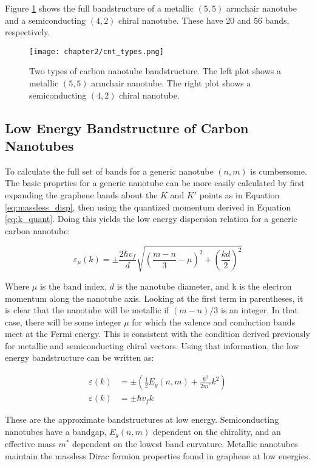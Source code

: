 Figure \ref{fig:cnt_types} shows the full bandstructure of a metallic $(5,5)$ armchair nanotube and a semiconducting $(4,2)$ chiral nanotube. These have 20 and 56 bands, respectively.

\begin{figure}
    \centering
    \texttt{[image: chapter2/cnt\_types.png]}
    \caption{Two types of carbon nanotube bandstructure. The left plot shows a metallic $(5,5)$ armchair nanotube. The right plot shows a semiconducting $(4,2)$ chiral nanotube.}
    \label{fig:cnt_types}
\end{figure}


\subsection{Low Energy Bandstructure of Carbon Nanotubes}

To calculate the full set of bands for a generic nanotube $(n,m)$ is cumbersome. The basic proprties for a generic nanotube can be more easily calculated by first expanding the graphene bands about the $K$ and $K'$ points as in Equation \ref{eq:massless_disp}, then using the quantized momentum derived in Equation \ref{eq:k_quant}. Doing this yields the low energy dispersion relation for a generic carbon nanotube:

\begin{equation}
    \varepsilon_{\mu}(k) = \pm\frac{2\hbar v_f}{d}\sqrt{\left(\frac{m-n}{3} - \mu\right)^2 + \left(\frac{kd}{2}\right)^2}
    \label{eq:low_e_cnt}
\end{equation}

Where $\mu$ is the band index, $d$ is the nanotube diameter, and k is the electron momentum along the nanotube axis. Looking at the first term in parentheses, it is clear that the nanotube will be metallic if $(m-n)/3$ is an integer. In that case, there will be some integer $\mu$ for which the valence and conduction bands meet at the Fermi energy. This is consistent with the condition derived previously for metallic and semiconducting chiral vectors. Using that information, the low energy bandstructure can be written as:

\begin{align}
    \varepsilon(k) &= \pm\left(\frac{1}{2}E_g(n,m) + \frac{\hbar^2}{2m^*}k^2\right) \\
    \varepsilon(k) &= \pm\hbar v_f k
\end{align}

These are the approximate bandstructures at low energy. Semiconducting nanotubes have a bandgap, $E_g(n,m)$ dependent on the chirality, and an effective mass $m^*$ dependent on the lowest band curvature. Metallic nanotubes maintain the massless Dirac fermion properties found in graphene at low energies.

